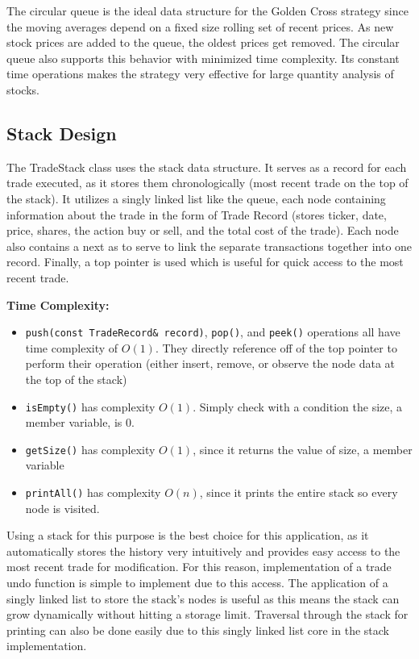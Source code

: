 \documentclass[12pt]{article}
\begin{document}
The circular queue is the ideal data structure for the Golden Cross strategy since the moving averages depend on a 
fixed size rolling set of recent prices. 
As new stock prices are added to the queue, the oldest prices get removed. 
The circular queue also supports this behavior with minimized time complexity. 
Its constant time operations makes the strategy very effective for large quantity analysis of stocks. 

\subsection{Stack Design}
The TradeStack class uses the stack data structure. 
It serves as a record for each trade executed, as it stores them chronologically (most recent trade on the top of the stack). 
It utilizes a singly linked list like the queue, each node containing information about the trade in the form of 
Trade Record (stores ticker, date, price, shares, the action buy or sell, and the total cost of the trade). 
Each node also contains a next as to serve to link the separate transactions together into one record. 
Finally, a top pointer is used which is useful for quick access to the most recent trade. 

\vspace{0.5cm}
{\large{\textbf{Time Complexity:}}}
\begin{itemize}
    \item \texttt{push(const TradeRecord\& record)}, \texttt{pop()}, and \texttt{peek()} operations all have time complexity of $O(1)$. They directly reference off of the top pointer to perform their operation (either insert, remove, or observe the node data at the top of the stack)
    \item \texttt{isEmpty()} has complexity $O(1)$. Simply check with a condition the size, a member variable, is $0$.
    \item \texttt{getSize()} has complexity $O(1)$, since it returns the value of size, a member variable
    \item \texttt{printAll()} has complexity $O(n)$, since it prints the entire stack so every node is visited. 
\end{itemize}

Using a stack for this purpose is the best choice for this application, as it automatically stores the history very 
intuitively and provides easy access to the most recent trade for modification. 
For this reason, implementation of a trade undo function is simple to implement due to this access. 
The application of a singly linked list to store the stack's nodes is useful as this means the stack can grow 
dynamically without hitting a storage limit. Traversal through the stack for printing can also be done easily due 
to this singly linked list core in the stack implementation. 
\end{document}
